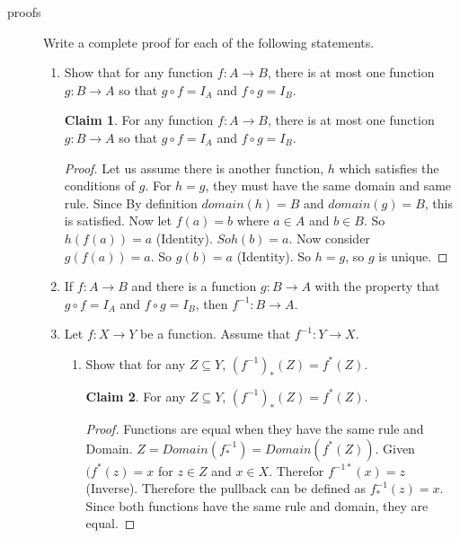 \documentclass[11pt]{letter}
\theoremstyle{definition}
\newtheorem{claim}{Claim}
\begin{document}
\begin{description}
\item[proofs] Write a complete proof for each of the following statements.
	\begin{enumerate}
	\item Show that for any function $f: A\rightarrow B$, there is at most one function $g:B\rightarrow A$ so that $g\circ f=I_A$ and $f\circ g=I_B$.
          \begin{claim}
            For any function $f: A\rightarrow B$, there is at most one function $g:B\rightarrow A$ so that $g\circ f=I_A$ and $f\circ g=I_B$.
          \end{claim}
          \begin{proof}
            Let us assume there is another function, $h$ which satisfies the conditions of $g$. For $h=g$, they must have the same domain and same rule. Since By definition $domain(h)=B$ and $domain(g)=B$, this is satisfied. Now let $f(a)=b$ where $a\in A$ and $b\in B$. So $h(f(a))=a$ (Identity). $So h(b)=a$. Now consider $g(f(a))=a$. So $g(b)=a$ (Identity). So $h=g$, so $g$ is unique.
          \end{proof}
          
          
			
			\item If $f:A\rightarrow B$ and there is a function $g:B\rightarrow A$ with the property that $g\circ f=I_A$ and $f\circ g=I_B$, then $f^{-1}:B\rightarrow A$.
			
			\item Let $f:X\rightarrow Y$ be a function. Assume that $f^{-1}:Y\rightarrow X$. 
				\begin{enumerate}
				\item Show that for any $Z\subseteq Y$, $(f^{-1})_*(Z)=f^*(Z)$.
                                  \begin{claim}
                                    For any $Z\subseteq Y$, $(f^{-1})_*(Z)=f^*(Z)$.
                                  \end{claim}
                                  \begin{proof}
                                    Functions are equal when they have the same rule and Domain. $Z=Domain(f^{-1}_*)=Domain(f^*(Z))$. Given $(f^*(z)=x$ for $z\in Z$ and $x\in X$. Therefor $f^{-1 *}(x)=z$ (Inverse). Therefore the pullback can be defined as $f^{-1}_*(z)=x$. Since both functions have the same rule and domain, they are equal.
                                  \end{proof}
                                  

\end{enumerate}
\end{enumerate}
\end{description}
\end{document}
